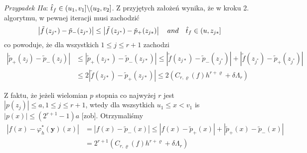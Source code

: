 \documentclass[oik, pdftex, robocza, man]{mgrwms}
\begin{document}
    \textit{Przypadek IIa}: $\hat{t}_{f} \in (u_{1}, v_{1}] \backslash (u_{2}, v_{2}]$.
    Z przyjętych założeń wynika, że w kroku 2. algorytmu, w pewnej iteracji musi zachodzić
    \begin{equation*}
        \left|\tilde{f}\left(z_{j^{*}}\right)-\tilde{p}_{-\!}\left(z_{j^{*}}\right)\right| \leq\left|\tilde{f}\left(z_{j^{*}}\right)-\tilde{p}_{+\!}\left(z_{j *}\right)\right| \quad and \quad \hat{t}_{f} \in\left(u, z_{j *}\right]
    \end{equation*}
    co powoduje, że dla wszystkich $1 \leq j \leq r+1$ zachodzi
    \begin{equation*}
        \begin{aligned}
            \left|\tilde{p}_{+}\left(z_{j}\right)-\tilde{p}_{-}\left(z_{j}\right)\right| & 
            \leq\left|\tilde{p}_{+}\left(z_{j *}\right)-\tilde{p}_{-}\left(z_{j *}\right)\right| \leq\left|\tilde{f}\left(z_{j *}\right)-\tilde{p}_{-}\left(z_{j^{*}}\right)\right|+\left|\tilde{f}\left(z_{j^{*}}\right)-\tilde{p}_{+}\left(z_{j^{*}}\right)\right| \\
            & \leq 2\left|\tilde{f}\left(z_{j *}\right)-\tilde{p}_{+}\left(z_{j *}\right)\right| \leq 2\left(C_{r, \varrho}(f) h^{r+\varrho}+\delta \Lambda_{r}\right)
        \end{aligned}
    \end{equation*}
    
    Z faktu, że jeżeli wielomian $p$ stopnia co najwyżej $r$ jest $\left|p\left(z_{j}\right)\right| \leq a, 1 \leq j \leq r+1$, wtedy dla wszsytkich $u_{1} \leq x<v_{1}$ is $|p(x)| \leq\left(2^{r+1}-1\right) a$ [zob]. Otrzymaliśmy
    \begin{equation*}
        \begin{aligned}
            \left|f(x)-\varphi_{h}^{*}(\mathbf{y})(x)\right| &=\left|f(x)-\tilde{p}_{-}(x)\right| \leq\left|f(x)-\tilde{p}_{+}(x)\right|+\left|\tilde{p}_{+}(x)-\tilde{p}_{-}(x)\right| \\
            &=2^{r+1}\left(C_{r, \varrho}(f) h^{r+\varrho}+\delta \Lambda_{r}\right)
        \end{aligned}
    \end{equation*}
\end{document}
